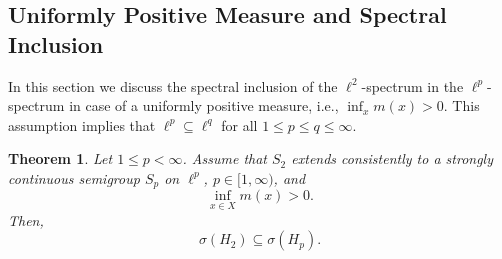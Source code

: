 \documentclass[10pt]{amsart}
\newtheorem{theorem}{Theorem}[section]
\theoremstyle{definition}
\begin{document}
\subsection{Uniformly Positive Measure and Spectral Inclusion}
%
In this section we discuss the spectral inclusion of the $\ell^2$-spectrum in the $\ell^p$-spectrum in case of a uniformly positive measure, i.e., $\inf_x m(x)>0.$ This assumption implies that $\ell^p\subseteq\ell^q$ for all $1\leq p\leq q\leq\infty.$ 


\begin{theorem}\label{finitemeasure}  Let $ 1\leq p< \infty $. Assume that  $ S_{2} $ extends consistently to a strongly continuous semigroup $S_p$ on $ \ell^{p} $, $p\in[1,\infty)$,  and  \[\inf_{x\in X} m(x)>0.\] Then,
  \[\sigma( H_2)\subseteq\sigma( H_p).\]
\end{theorem}
\end{document}
